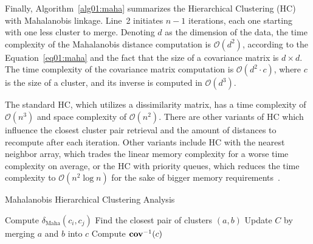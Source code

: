 Finally, Algorithm~\ref{alg01:maha} summarizes the Hierarchical Clustering (HC) with Mahalanobis linkage. Line~2 initiates $n-1$ iterations, each one starting with one less cluster to merge. Denoting $d$ as the dimension of the data, the time complexity of the Mahalanobis distance computation is $\mathcal{O}(d^2)$, according to the Equation~\ref{eq01:maha} and the fact that the size of a covariance matrix is $d \times d$. The time complexity of the covariance matrix computation is $\mathcal{O}(d^2 \cdot c)$, where $c$ is the size of a cluster, and its inverse is computed in $\mathcal{O}(d^3)$.

The standard HC, which utilizes a dissimilarity matrix, has a time complexity of $\mathcal{O}(n^3)$ and space complexity of $\mathcal{O}(n^2)$. There are other variants of HC which influence the closest cluster pair retrieval and the amount of distances to recompute after each iteration. Other variants include HC with the nearest neighbor array, which trades the linear memory complexity for a worse time complexity on average, or the HC with priority queues, which reduces the time complexity to $\mathcal{O}(n^2 \log n)$ for the sake of bigger memory requirements~\cite{day1984efficient}.

\begin{algorithm}[t]
    \caption{Mahalanobis Hierarchical Clustering Analysis}
    \label{alg01:maha}
    \begin{algorithmic}[1]
                \State Compute $\delta_\text{Maha}(c_i,c_j)$ 
            \EndFor
            \State Find the closest pair of clusters $(a, b)$
            \State Update $C$ by merging $a$ and $b$ into $c$
            \State Compute $\operatorname{\textbf{cov}}^{-1}(c)$ 
        \EndWhile
        \EndProcedure
    \end{algorithmic}
\end{algorithm}



